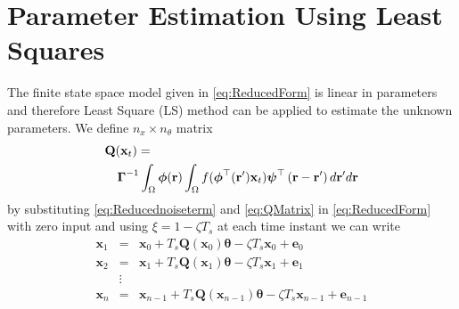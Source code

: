 \documentclass[twocolumn,11pt,a4paper]{article}		%
\begin{document}
\section{Parameter Estimation Using Least Squares}\label{LeastSquaresAppendix} 
The finite state space model  given in \ref{eq:ReducedForm} is linear in parameters and therefore Least Square (LS) method can be applied to estimate the unknown parameters. We define $n_x \times n_{\theta}$ matrix
\begin{eqnarray}\label{eq:QMatrix}
	\lefteqn {\mathbf{Q}(\mathbf{x}_t)=} \\
&&\boldsymbol{\Gamma}^{ - 1}\int_\Omega {\boldsymbol{\phi}(\mathbf{r}) \int_\Omega {f(\boldsymbol{\phi}^{\top}(\mathbf{r}')\mathbf{x}_t)\boldsymbol{\psi}^{\top} \left(\mathbf{r}-\mathbf{r}'\right)d\mathbf{r}'} d\mathbf{r}}\nonumber
\end{eqnarray}
by substituting \ref{eq:Reducednoiseterm} and \ref{eq:QMatrix} in \ref{eq:ReducedForm} with zero input and using $\xi = 1-\zeta T_s$ at each time instant we can write
\begin{eqnarray}
	\mathbf x_{1}&=&\mathbf x_{0}+T_s \mathbf Q(\mathbf x_0) \boldsymbol{\theta}-\zeta T_s\mathbf x_0+\mathbf e_0 \nonumber \\
	\mathbf x_{2}&=&\mathbf x_{1}+T_s \mathbf Q(\mathbf x_1) \boldsymbol{\theta}-\zeta T_s\mathbf x_1+\mathbf e_1\nonumber\\
	&\vdots& \\
	\mathbf x_{n}&=&\mathbf x_{n-1}+T_s \mathbf Q(\mathbf x_{n-1}) \boldsymbol{\theta}-\zeta T_s\mathbf x_{n-1}+\mathbf e_{n-1} \nonumber
\end{eqnarray}
\end{document}
